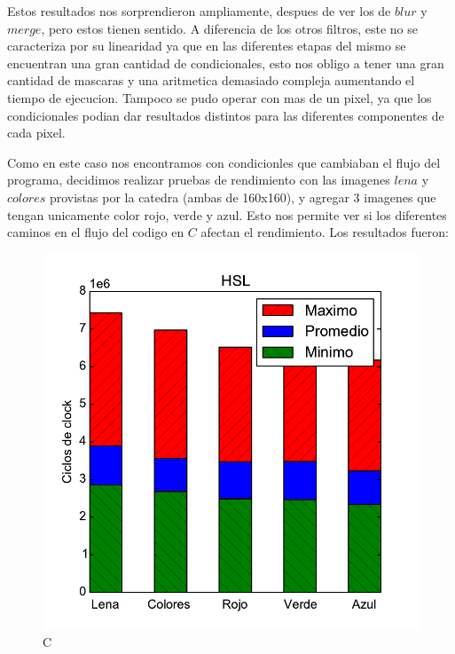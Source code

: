 Estos resultados nos sorprendieron ampliamente, despues de ver los de $blur$ y $merge$, pero estos tienen sentido. A diferencia de los otros filtros, este no se caracteriza por su linearidad ya que en las diferentes etapas del mismo se encuentran una gran cantidad de condicionales, esto nos obligo a tener una gran cantidad de mascaras y una aritmetica demasiado compleja aumentando el tiempo de ejecucion. Tampoco se pudo operar con mas de un pixel, ya que los condicionales podian dar resultados distintos para las diferentes componentes de cada pixel.

Como en este caso nos encontramos con condicionles que cambiaban el flujo del programa, decidimos realizar pruebas de rendimiento con las imagenes $lena$ y $colores$ provistas por la catedra (ambas de 160x160), y agregar 3 imagenes que tengan unicamente color rojo, verde y azul. Esto nos permite ver si los diferentes caminos en el flujo del codigo en $C$ afectan el rendimiento. Los resultados fueron:

\begin{figure}[h!]
	\centering
	\includegraphics[scale=0.45]{images/hsl_comparationC}
	\caption{C}
\end{figure}

